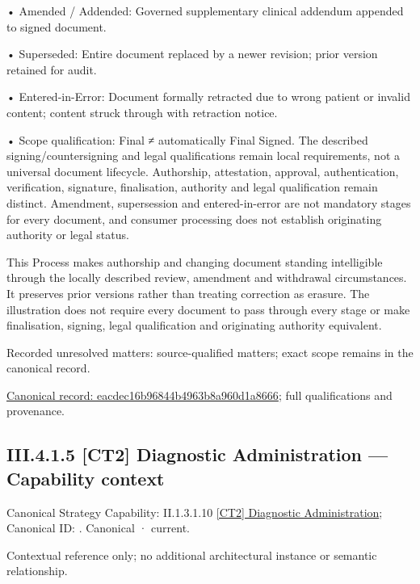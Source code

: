 •
Amended / Addended: Governed supplementary clinical addendum appended to signed document.



•
Superseded: Entire document replaced by a newer revision; prior version retained for audit.



•
Entered-in-Error: Document formally retracted due to wrong patient or invalid content; content struck through with retraction notice.



•
Scope qualification: Final ≠ automatically Final Signed. The described signing/countersigning and legal qualifications remain local requirements, not a universal document lifecycle. Authorship, attestation, approval, authentication, verification, signature, finalisation, authority and legal qualification remain distinct. Amendment, supersession and entered-in-error are not mandatory stages for every document, and consumer processing does not establish originating authority or legal status.



This Process makes authorship and changing document standing intelligible through the locally described review, amendment and withdrawal circumstances. It preserves prior versions rather than treating correction as erasure. The illustration does not require every document to pass through every stage or make finalisation, signing, legal qualification and originating authority equivalent.


{\small Recorded unresolved matters: source-qualified matters; exact scope remains in the canonical record.}\par
{\footnotesize \href{../../../../../../../continuum/business/business-process/eacdec16b96844b4963b8a960d1a8666.md}{Canonical record: eacdec16b96844b4963b8a960d1a8666}; full qualifications and provenance.}\par
\subsection*{III.4.1.5 [CT2] Diagnostic Administration — Capability context}
\label{navigation:III.4.1.5}

{\small Canonical Strategy Capability: II.1.3.1.10 \hyperref[element:3cc720ba2e8b4d7a94bb349391d61895]{[CT2] Diagnostic Administration}; Canonical ID: \texttt{}. Canonical · current.}\par
Contextual reference only; no additional architectural instance or semantic relationship.\par
